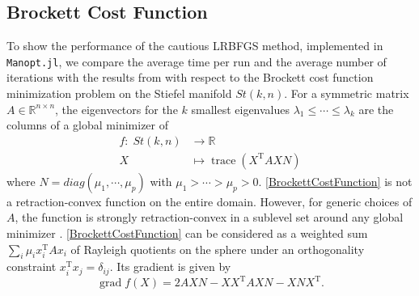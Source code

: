 \subsection{Brockett Cost Function}
\label{Section5.2.2}

To show the performance of the cautious LRBFGS method, implemented in \lstinline!Manopt.jl!, we compare the average time per run and the average number of iterations with the results from \cite[p.~1683]{HuangGallivanAbsil:2015} with respect to the Brockett cost function minimization problem on the Stiefel manifold $St(k,n)$. For a symmetric matrix $A \in \mathbb{R}^{n \times n}$, the eigenvectors for the $k$ smallest eigenvalues $\lambda_1 \leq \cdots \leq \lambda_k$ are the columns of a global minimizer of
\begin{equation}\label{BrockettCostFunction}
    \begin{split}
        f \colon \; St(k,n) & \to \mathbb{R} \\
        X & \mapsto \operatorname{trace}(X^{\mathrm{T}} A X N) 
    \end{split}
\end{equation}
where $N = diag(\mu_1, \cdots, \mu_p)$ with $\mu_1 > \cdots > \mu_p > 0$. \cref{BrockettCostFunction} is not a retraction-convex function on the entire domain. However, for generic choices of $A$, the function is strongly retraction-convex in a sublevel set around any global minimizer \cite[p.~1678]{HuangGallivanAbsil:2015}. \cref{BrockettCostFunction} can be considered as a weighted sum $\sum_i \mu_i x^{\mathrm{T}}_i A x_i$ of Rayleigh quotients on the sphere under an orthogonality constraint $x^{\mathrm{T}}_i x_j = \delta_{ij}$. Its gradient is given by 
\begin{equation*}
    \operatorname{grad} f(X) = 2 A X N - X X^{\mathrm{T}} A X N - X N X^{\mathrm{T}}.
\end{equation*}

